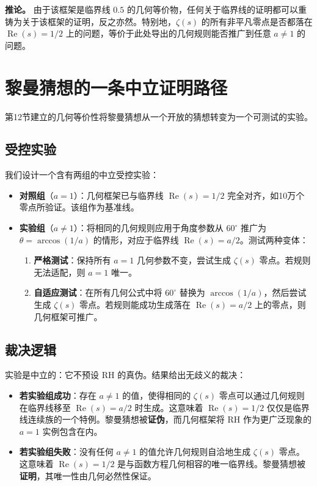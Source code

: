 \documentclass[12pt,a4paper]{article}
\begin{document}
\textbf{推论。} 由于该框架是临界线 $0.5$ 的几何等价物，任何关于临界线的证明都可以重铸为关于该框架的证明，反之亦然。特别地，$\zeta(s)$ 的所有非平凡零点是否都落在 $\operatorname{Re}(s)=1/2$ 上的问题，等价于此处导出的几何规则能否推广到任意 $a \neq 1$ 的问题。

\section{黎曼猜想的一条中立证明路径}

第12节建立的几何等价性将黎曼猜想从一个开放的猜想转变为一个可测试的实验。

\subsection{受控实验}

我们设计一个含有两组的中立受控实验：

\begin{itemize}
\item \textbf{对照组}（$a=1$）：几何框架已与临界线 $\operatorname{Re}(s)=1/2$ 完全对齐，如10万个零点所验证。该组作为基准线。
\item \textbf{实验组}（$a \neq 1$）：将相同的几何规则应用于角度参数从 $60^\circ$ 推广为 $\theta = \arccos(1/a)$ 的情形，对应于临界线 $\operatorname{Re}(s)=a/2$。测试两种变体：
\begin{enumerate}
\item \textbf{严格测试}：保持所有 $a=1$ 几何参数不变，尝试生成 $\zeta(s)$ 零点。若规则无法适配，则 $a=1$ 唯一。
\item \textbf{自适应测试}：在所有几何公式中将 $60^\circ$ 替换为 $\arccos(1/a)$，然后尝试生成 $\zeta(s)$ 零点。若规则能成功生成落在 $\operatorname{Re}(s)=a/2$ 上的零点，则几何框架可推广。
\end{enumerate}
\end{itemize}

\subsection{裁决逻辑}

实验是中立的：它不预设 RH 的真伪。结果给出无歧义的裁决：

\begin{itemize}
\item \textbf{若实验组成功}：存在 $a \neq 1$ 的值，使得相同的 $\zeta(s)$ 零点可以通过几何规则在临界线移至 $\operatorname{Re}(s)=a/2$ 时生成。这意味着 $\operatorname{Re}(s)=1/2$ 仅仅是临界线连续族的一个特例。黎曼猜想被\textbf{证伪}，而几何框架将 RH 作为更广泛现象的 $a=1$ 实例包含在内。

\item \textbf{若实验组失败}：没有任何 $a \neq 1$ 的值允许几何规则自洽地生成 $\zeta(s)$ 零点。这意味着 $\operatorname{Re}(s)=1/2$ 是与函数方程几何相容的唯一临界线。黎曼猜想被\textbf{证明}，其唯一性由几何必然性保证。
\end{itemize}
\end{document}
